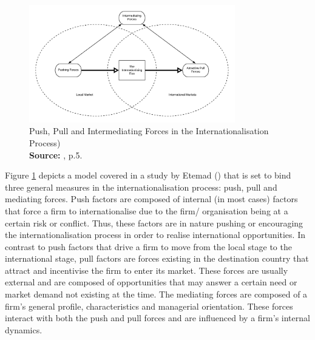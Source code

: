 \documentclass[12pt,a4paper]{article}
\newcommand*{\captionsource}[2]{%
  \caption[{#1}]{%
    #1%
    \\\hspace{\linewidth}%
    \textbf{Source:} #2%
  }%
}
\begin{document}
  \vspace{5mm}
\begin{figure}[H]
	\centering
  \includegraphics[width=0.8\textwidth, scale=0.1]{figures/fig_pull_push_forces}
  \vspace{5mm}
    \captionsetup{justification=centering,margin=2cm}
      \captionsource{Push, Pull and Intermediating Forces in the Internationalisation Process)}{\cite{etemadInternationalizationSmallMediumsized2004}, p.5.}
	\label{fig:pull_push_forces}
\end{figure}

Figure \ref{fig:pull_push_forces} depicts a model covered in a study by Etemad (\citeyear{etemadInternationalizationSmallMediumsized2004}) that is set to bind three general measures in the internationalisation process: push, pull and mediating forces. Push factors are composed of internal (in most cases) factors that force a firm to internationalise due to the firm/ organisation being at a certain risk or conflict. Thus, these factors are in nature pushing or encouraging the internationalisation process in order to realise international opportunities. In contrast to push factors that drive a firm to move from the local stage to the international stage, pull factors are forces existing in the destination country that attract and incentivise the firm to enter its market. These forces are usually external and are composed of opportunities that may answer a certain need or market demand not existing at the time. The mediating forces are composed of a firm's general profile, characteristics and managerial orientation. These forces interact with both the push and pull forces and are influenced by a firm's internal dynamics.




\end{document}
